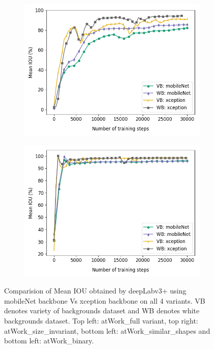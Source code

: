 \begin{figure}[!htb]
\begin{subfigure}[c]{.5\textwidth}
			\includegraphics[width=1\linewidth]{images/mobxcep_shape}
		\end{subfigure}
		\begin{subfigure}[c]{.5\textwidth}
			\centering
			\includegraphics[width=1\linewidth]{images/mobxcep_binary}
		\end{subfigure}
		\caption{Comparision of Mean IOU obtained by deepLabv3+ using mobileNet backbone Vs xception backbone on all 4 variants. VB denotes variety of backgrounds dataset and WB denotes white backgrounds dataset. Top left: atWork\_full variant, top right: atWork\_size\_invariant, bottom left: atWork\_similar\_shapes and bottom left: atWork\_binary.}
		\label{Fig:4vars}
	\end{figure}

